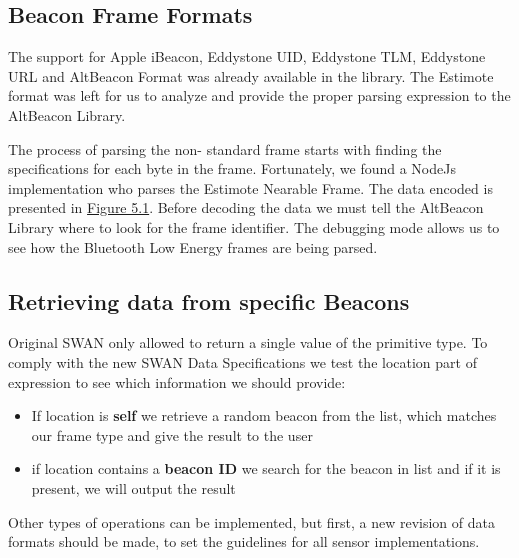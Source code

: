 \subsection{Beacon Frame Formats}
The support for Apple iBeacon, Eddystone UID, Eddystone TLM, Eddystone URL and AltBeacon Format was already available in the library.
The Estimote format was left for us to analyze and provide the proper parsing expression to the AltBeacon Library.

The process of parsing the non- standard frame starts with finding the specifications for each byte in the frame. Fortunately, we found a NodeJs implementation 
who parses the Estimote Nearable Frame. The data encoded is presented in \hyperref[fig:estimote_format]{Figure 5.1}.
Before decoding the data we must tell the AltBeacon Library where to look for the frame identifier. The debugging mode allows us to see how the Bluetooth Low Energy frames are being parsed.

\subsection{Retrieving data from specific Beacons}
Original SWAN only allowed to return a single value of the primitive type. To comply with the new SWAN Data Specifications we test the location part of expression to see which information we should provide:

\begin{itemize}
 \item If location is \textbf{self} we retrieve a random beacon from the list, which matches our frame type and give the result to the user
 \item if location contains a \textbf{beacon ID} we search for the beacon in list and if it is present, we will output the result
\end{itemize}

Other types of operations can be implemented, but first, a new revision of data formats should be made, to set the guidelines for all sensor implementations.

